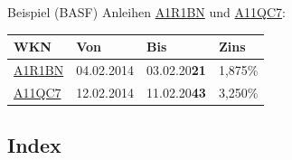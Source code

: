 \documentclass{beamer}
\newcommand{\wkn}[1]{\href{https://www.finanzen.net/anleihen/#1}{#1}}
\begin{document}
			\begin{frame}{Beispiel (BASF)}
				Anleihen \href{https://www.finanzen.net/anleihen/a1r1bn-basf-se-anleihe}{A1R1BN} und \href{https://www.finanzen.net/anleihen/a11qc7-basf-se-anleihe}{A11QC7}:
				\begin{center}
					\begin{tabularx}{8cm}{l|l|l|l}
						WKN				& Von			& Bis					& Zins		\\
						\hline
						\wkn{A1R1BN}	& 04.02.2014	& 03.02.20\textbf{21}	& 1,875\%	\\
						\wkn{A11QC7}	& 12.02.2014	& 11.02.20\textbf{43}	& 3,250\%	\\
					\end{tabularx}
				\end{center}
			\end{frame}
		
%		
%			
		
		\subsection{Index}
		
\end{document}
